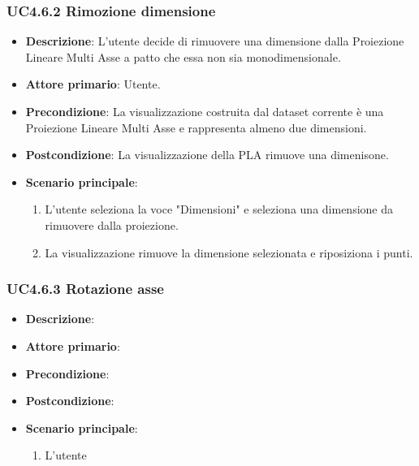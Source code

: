 \subsubsection{UC4.6.2 Rimozione dimensione}
\label{ssub:uc4.6.2}
\begin{itemize}
    \item \textbf{Descrizione}: L’utente decide di rimuovere una dimensione dalla Proiezione Lineare Multi Asse
                                a patto che essa non sia monodimensionale.

    \item \textbf{Attore primario}: Utente.
    
    \item \textbf{Precondizione}:   La visualizzazione costruita dal dataset corrente è una Proiezione Lineare Multi Asse
                                    e rappresenta almeno due dimensioni.
    \item \textbf{Postcondizione}:  La visualizzazione della PLA rimuove una dimenisone.

	\item \textbf{Scenario principale}:
        \begin{enumerate}
            \item L'utente seleziona la voce "Dimensioni" e seleziona una dimensione da rimuovere dalla proiezione.
            \item La visualizzazione rimuove la dimensione selezionata e riposiziona i punti.
           
        \end{enumerate}
\end{itemize}

\subsubsection{UC4.6.3 Rotazione asse}
\label{ssub:uc4.6.3}
\begin{itemize}
    \item \textbf{Descrizione}:
    \item \textbf{Attore primario}:
    \item \textbf{Precondizione}:
    \item \textbf{Postcondizione}:
    \item \textbf{Scenario principale}:
    \begin{enumerate}
        \item L'utente
    \end{enumerate}
\end{itemize}

